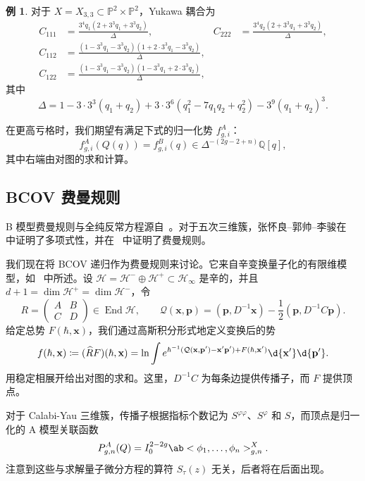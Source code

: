 \documentclass{amsart}
\theoremstyle{definition}
\newtheorem{exm}[thm]{例}
\theoremstyle{remark}
\theoremstyle{plain}
\theoremstyle{definition}
\theoremstyle{remark}
\newcommand{\Q}{\mathbb{Q}}
\renewcommand{\P}{\mathbb{P}}
\newcommand{\mc}[1]{\mathcal{#1}}
\newcommand{\mbf}[1]{\mathbf{#1}}
\newcommand{\bp}{\mbf{p}}
\newcommand{\wh}[1]{\widehat{#1}}
\newcommand{\1}{\mathbf{1}}
\newcommand{\2}{\mathbf{2}}
\newcommand{\3}{\mathbf{3}}
\DeclareMathOperator{\End}{End}
\begin{document}
\begin{exm}
    对于 \(X = X_{3,3} \subset \P^2 \times \P^2\)，Yukawa 耦合为
    \begin{align*}
        C_{111} &= \frac{3^4 q_1 (2+3^3q_1+3^3q_2)}{\Delta}, & C_{222} &= \frac{3^4 q_2(2+3^3q_1+3^3q_2)}{\Delta}, \\
        C_{112} &= \frac{(1-3^3q_1-3^3q_2)(1+2\cdot 3^3 q_1 - 3^3 q_2)}{\Delta}, \\
        C_{122} &= \frac{(1-3^3q_1-3^3q_2)(1-3^3q_1+2\cdot3^3q_2)}{\Delta},
    \end{align*}
    其中
    \[ \Delta = 1 - 3\cdot3^3(q_1+q_2) + 3\cdot3^6(q_1^2 - 7q_1q_2+q_2^2) - 3^9(q_1+q_2)^3. \]
\end{exm}

在更高亏格时，我们期望有满足下式的归一化势 \(f^A_{g,i}\)：
\[ f^A_{g,i}(Q(q)) = f^B_{g,i}(q) \in \Delta^{-(2g-2+n)}\Q[q], \]
其中右端由对图的求和计算。

\subsection{BCOV 费曼规则}%
\label{sub:The BCOV Feynman rule}

B 模型费曼规则与全纯反常方程源自~\cite{BCOV1994}。对于五次三维簇，张怀良–郭帅–李骏在~\cite{CGL2021} 中证明了多项式性，并在~\cite{CGL2026} 中证明了费曼规则。

我们现在将 BCOV 递归作为费曼规则来讨论。它来自辛变换量子化的有限维模型，如~ 中所述。设 \(\mc{H} = \mc{H}^- \oplus \mc{H}^+ \subset \mc{H}_{\infty}\) 是辛的，并且 \(d+1 = \dim \mc{H}^+ = \dim \mc{H}^-\)，令
\[ R = \begin{pmatrix} A & B \\ C & D \end{pmatrix} \in \End \mc{H}, \qquad \mc{Q}(\mbf{x},\bp) = (\bp, D^{-1}\mbf{x}) - \frac{1}{2}(\bp, D^{-1}C\bp). \]
给定总势 \(F(\hbar, \mbf{x})\)，我们通过高斯积分形式地定义变换后的势
\[ f(\hbar, \mbf{x}) \coloneqq (\wh{R}F)(\hbar,\mbf{x}) = \ln \int e^{\hbar^{-1}(\mc{Q}(\mbf{x},\bp') - \mbf{x}'\bp') + F(\hbar,\mbf{x}')}\d{\mbf{x}'}\d{\bp'}. \]
用稳定相展开给出对图的求和。这里，\(D^{-1}C\) 为每条边提供传播子，而 \(F\) 提供顶点。

对于 Calabi-Yau 三维簇，传播子根据指标个数记为 \(S^{\varphi\varphi}\)、\(S^{\varphi}\) 和 \(S\)，而顶点是归一化的 A 模型关联函数
\[ P^A_{g,n}(Q) = I_0^{2-2g}\ab<\phi_1, \ldots, \phi_n>^X_{g,n}. \]
注意到这些与求解量子微分方程的算符 \(S_{\tau}(z)\) 无关，后者将在后面出现。
\end{document}
